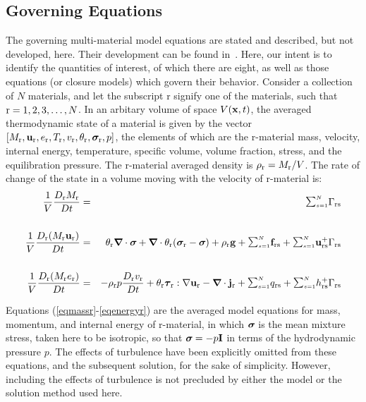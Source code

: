 \subsection{Governing Equations}\label{sec:governing_equations}
The governing multi-material model equations are stated and described, but not developed, here.  Their development can be found in~\cite{kashiwa2000}. Here, our intent is to identify the quantities of interest, of which there are eight, as well as those equations (or closure models) which govern their behavior.  Consider a collection of $N$ materials, and let the subscript r signify one of the materials, such that ${\rm r} = 1, 2, 3, \dots, N$.  In an arbitary volume of space $V({\bf x},t)$, the averaged thermodynamic state of a material is given by the vector $[M_{\rm r}, {\bf u}_{\rm r}, e_{\rm r}, T_{\rm r}, v_{\rm r}, \theta_{\rm r}, \mbox{\boldmath $\sigma \!\!$ \unboldmath}_{\rm r}, p]$, the elements of which are the r-material mass, velocity, internal energy, temperature, specific volume, volume fraction, stress, and the equilibration pressure.  The r-material averaged density is $\rho_{\rm r} = M_{\rm r}/V$.  The rate of change of the state in a volume moving with the velocity of r-material is:
%
\noindent
\begin{eqnarray}
{1\over V}{D_\rmr M_\rmr \over Dt} &=&
\SUM\Gamma_{\rmr\rms}
\label{eqmassr} \\
\nonumber \\
{1\over V}{D_\rmr (M_\rmr \bfu_\rmr) \over Dt} &=&
\theta_\rmr \bnabla\cdot\sig +
\bnabla\cdot\theta_\rmr(\sig_\rmr - \sig) + 
\rho_\rmr\bfg + 
\SUM \bff_{\rmr\rms} + 
\SUM \bfu_{\rmr\rms}^+ 
\Gamma_{\rmr\rms}
\label{eqmomr}\\ \nonumber \\
{1\over V}{D_\rmr (M_\rmr e_\rmr) \over Dt} &=& -
\rho_\rmr p {D_\rmr v_\rmr\over Dt} +
\theta_\rmr\taubold_\rmr:\nabla\bfu_\rmr - 
\bnabla\cdot\bfj_\rmr +
\SUM q_{\rmr\rms} +
\SUM h_{\rmr\rms}^+ 
\Gamma_{\rmr\rms}
\label{eqenergyr}
\end{eqnarray}

Equations (\ref{eqmassr}-\ref{eqenergyr}) are the averaged model equations for mass, momentum, and internal energy of r-material, in which $\mbox{\boldmath $\sigma \!\!$ \unboldmath}$ is the mean mixture stress, taken here to be isotropic, so that $\mbox{\boldmath $\sigma \!\!$ \unboldmath} = -p{\bf I}$ in terms of the hydrodynamic pressure $p$.  The effects of turbulence have been explicitly omitted from these equations, and the subsequent solution, for the sake of simplicity.  However, including the effects of turbulence is not precluded by either the model or the solution method used here.

